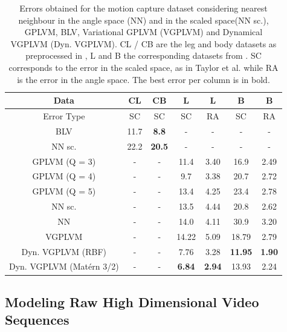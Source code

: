 \begin{table}[h]
\caption{
\small{
Errors obtained for the motion capture dataset considering nearest neighbour in the angle space (NN) and in the scaled space(NN sc.), GPLVM, BLV, Variational GPLVM (VGPLVM) and Dynamical VGPLVM (Dyn. VGPLVM). CL / CB are the leg and body datasets as preprocessed in \cite{Taylor}, L and B the corresponding datasets from \cite{gplvmLarger}. SC corresponds to the error in the scaled space, as in Taylor et al. while RA is the error in the angle space. The best error per column is in bold. }}
\label{motionCaptureTable}
\begin{center}
\begin{tabular}{c||c|c|c|c|c|c}
Data & CL & CB & L & L & B & B \\  \hline
Error Type & SC & SC & SC & RA & SC & RA \\
\hline \hline
BLV 			       & 11.7 & \textbf{8.8} & - & - & - & - \\  \hline
NN sc.   		       & 22.2 & \textbf{20.5} & - & - & - & - \\ \hline
GPLVM (Q = 3)	       & - & - & 11.4 & 3.40 & 16.9 & 2.49 \\ \hline
GPLVM (Q = 4)	       & - & - & 9.7  & 3.38 & 20.7 & 2.72 \\ \hline
GPLVM (Q = 5)	       & - & - & 13.4 & 4.25 & 23.4 & 2.78 \\ \hline
NN sc.  		       & - & - & 13.5 & 4.44 & 20.8 & 2.62 \\ \hline
NN 		 	       & - & - & 14.0 & 4.11 & 30.9 & 3.20 \\ \hline
VGPLVM                         & - & - & 14.22& 5.09 & 18.79& 2.79 \\ \hline
Dyn. VGPLVM (RBF)              & - & - & 7.76 & 3.28 & \textbf{11.95} & \textbf{1.90} \\ \hline
Dyn. VGPLVM (Mat\'ern 3/2)     & - & - & \textbf{6.84} & \textbf{2.94} & 13.93 & 2.24 \\
\end{tabular}
\end{center}
\end{table}



\subsection{Modeling Raw High Dimensional Video Sequences}

